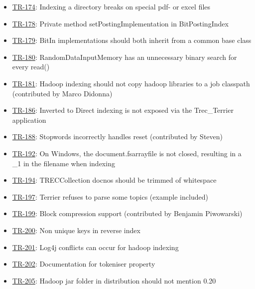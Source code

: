 \begin{itemize}
\tightlist
\item
  \href{http://terrier.org/issues/browse/TR-174}{TR-174}: Indexing a
  directory breaks on special pdf- or excel files
\item
  \href{http://terrier.org/issues/browse/TR-178}{TR-178}: Private method
  setPostingImplementation in BitPostingIndex
\item
  \href{http://terrier.org/issues/browse/TR-179}{TR-179}: BitIn
  implementations should both inherit from a common base class
\item
  \href{http://terrier.org/issues/browse/TR-180}{TR-180}:
  RandomDataInputMemory has an unnecessary binary search for every
  read()
\item
  \href{http://terrier.org/issues/browse/TR-181}{TR-181}: Hadoop
  indexing should not copy hadoop libraries to a job classpath
  (contributed by Marco Didonna)
\item
  \href{http://terrier.org/issues/browse/TR-186}{TR-186}: Inverted to
  Direct indexing is not exposed via the Trec\_Terrier application
\item
  \href{http://terrier.org/issues/browse/TR-188}{TR-188}: Stopwords
  incorrectly handles reset (contributed by Steven)
\item
  \href{http://terrier.org/issues/browse/TR-192}{TR-192}: On Windows,
  the document.fsarrayfile is not closed, resulting in a \_1 in the
  filename when indexing
\item
  \href{http://terrier.org/issues/browse/TR-194}{TR-194}: TRECCollection
  docnos should be trimmed of whitespace
\item
  \href{http://terrier.org/issues/browse/TR-197}{TR-197}: Terrier
  refuses to parse some topics (example included)
\item
  \href{http://terrier.org/issues/browse/TR-199}{TR-199}: Block
  compression support (contributed by Benjamin Piwowarski)
\item
  \href{http://terrier.org/issues/browse/TR-200}{TR-200}: Non unique
  keys in reverse index
\item
  \href{http://terrier.org/issues/browse/TR-201}{TR-201}: Log4j
  conflicts can occur for hadoop indexing
\item
  \href{http://terrier.org/issues/browse/TR-202}{TR-202}: Documentation
  for tokeniser property
\item
  \href{http://terrier.org/issues/browse/TR-205}{TR-205}: Hadoop jar
  folder in distribution should not mention 0.20

\end{itemize}
